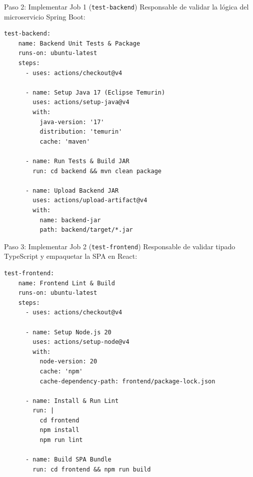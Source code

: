 \documentclass[aspectratio=169]{beamer}
\begin{document}
\begin{frame}[fragile]{Paso 2: Implementar Job 1 (\texttt{test-backend})}
  \vspace{0.05cm}
  Responsable de validar la lógica del microservicio Spring Boot:
  \vspace{0.1cm}
  \begin{lstlisting}[style=yamltiny]
  test-backend:
    name: Backend Unit Tests & Package
    runs-on: ubuntu-latest
    steps:
      - uses: actions/checkout@v4

      - name: Setup Java 17 (Eclipse Temurin)
        uses: actions/setup-java@v4
        with:
          java-version: '17'
          distribution: 'temurin'
          cache: 'maven'

      - name: Run Tests & Build JAR
        run: cd backend && mvn clean package

      - name: Upload Backend JAR
        uses: actions/upload-artifact@v4
        with:
          name: backend-jar
          path: backend/target/*.jar
  \end{lstlisting}
\end{frame}

\begin{frame}[fragile]{Paso 3: Implementar Job 2 (\texttt{test-frontend})}
  \vspace{0.05cm}
  Responsable de validar tipado TypeScript y empaquetar la SPA en React:
  \vspace{0.1cm}
  \begin{lstlisting}[style=yamltiny]
  test-frontend:
    name: Frontend Lint & Build
    runs-on: ubuntu-latest
    steps:
      - uses: actions/checkout@v4

      - name: Setup Node.js 20
        uses: actions/setup-node@v4
        with:
          node-version: 20
          cache: 'npm'
          cache-dependency-path: frontend/package-lock.json

      - name: Install & Run Lint
        run: |
          cd frontend
          npm install
          npm run lint

      - name: Build SPA Bundle
        run: cd frontend && npm run build
  \end{lstlisting}
\end{frame}
\end{document}
